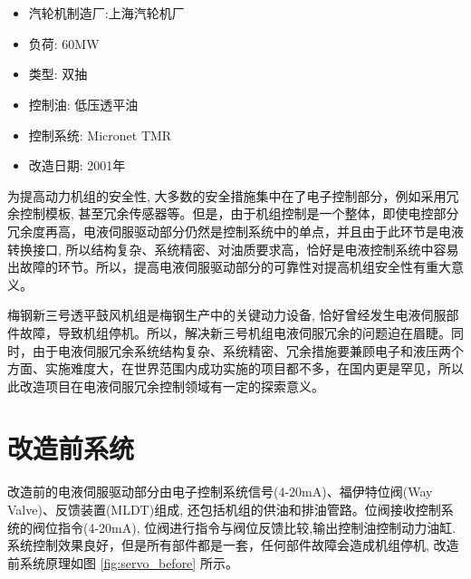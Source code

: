 \documentclass[UTF8,a1paper,twoside,11pt]{article}
\begin{document}
{\par

\begin{multicols}{2}
\section*{{}}
\par
\begin{itemize}
	\item 汽轮机制造厂:上海汽轮机厂
	\item 负荷: 60MW
	\item 类型: 双抽
	\item 控制油: 低压透平油
	\item 控制系统: Micronet TMR
	\item 改造日期: 2001年
\end{itemize}




为提高动力机组的安全性, 大多数的安全措施集中在了电子控制部分，例如采用冗余控制模板, 甚至冗余传感器等。但是，由于机组控制是一个整体，即使电控部分冗余度再高，电液伺服驱动部分仍然是控制系统中的单点，并且由于此环节是电液转换接口, 所以结构复杂、系统精密、对油质要求高，恰好是电液控制系统中容易出故障的环节。所以，提高电液伺服驱动部分的可靠性对提高机组安全性有重大意义。\par
梅钢新三号透平鼓风机组是梅钢生产中的关键动力设备, 恰好曾经发生电液伺服部件故障，导致机组停机。所以，解决新三号机组电液伺服冗余的问题迫在眉睫。同时，由于电液伺服冗余系统结构复杂、系统精密、冗余措施要兼顾电子和液压两个方面、实施难度大，在世界范围内成功实施的项目都不多，在国内更是罕见，所以此改造项目在电液伺服冗余控制领域有一定的探索意义。\par

\section*{改造前系统}
改造前的电液伺服驱动部分由电子控制系统信号(4-20mA)、福伊特位阀(Way Valve)、反馈装置(MLDT)组成, 还包括机组的供油和排油管路。位阀接收控制系统的阀位指令(4-20mA), 位阀进行指令与阀位反馈比较,输出控制油控制动力油缸. 系统控制效果良好，但是所有部件都是一套，任何部件故障会造成机组停机, 改造前系统原理如图 \ref{fig:servo_before} 所示。\par


\end{multicols}}
\end{document}
